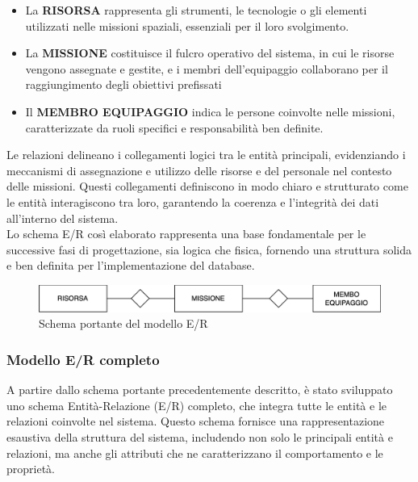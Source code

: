 \begin{itemize}
    \item La \textbf{RISORSA} rappresenta gli strumenti, le tecnologie o gli elementi utilizzati nelle missioni spaziali, essenziali per il loro svolgimento.
    \item La \textbf{MISSIONE} costituisce il fulcro operativo del sistema, in cui le risorse vengono assegnate e gestite, e i membri dell'equipaggio collaborano per il raggiungimento degli obiettivi prefissati
    \item Il \textbf{MEMBRO EQUIPAGGIO} indica le persone coinvolte nelle missioni, caratterizzate da ruoli specifici e responsabilità ben definite.
\end{itemize}
\noindent
Le relazioni delineano i collegamenti logici tra le entità principali, evidenziando i meccanismi di assegnazione e utilizzo delle risorse e del personale nel contesto delle missioni. Questi collegamenti definiscono in modo chiaro e strutturato come le entità interagiscono tra loro, garantendo la coerenza e l'integrità dei dati all'interno del sistema.\\
Lo schema E/R così elaborato rappresenta una base fondamentale per le successive fasi di progettazione, sia logica che fisica, fornendo una struttura solida e ben definita per l’implementazione del database.

\begin{figure}[h!]
    \centering
    \includegraphics[width=1\textwidth]{Media/schema_portante.png}
    \caption{Schema portante del modello E/R}
    \label{fig:schema_portante}
\end{figure}


\subsubsection{Modello E/R completo}

A partire dallo schema portante precedentemente descritto, è stato sviluppato uno schema Entità-Relazione (E/R) completo, che integra tutte le entità e le relazioni coinvolte nel sistema. Questo schema fornisce una rappresentazione esaustiva della struttura del sistema, includendo non solo le principali entità e relazioni, ma anche gli attributi che ne caratterizzano il comportamento e le proprietà.


